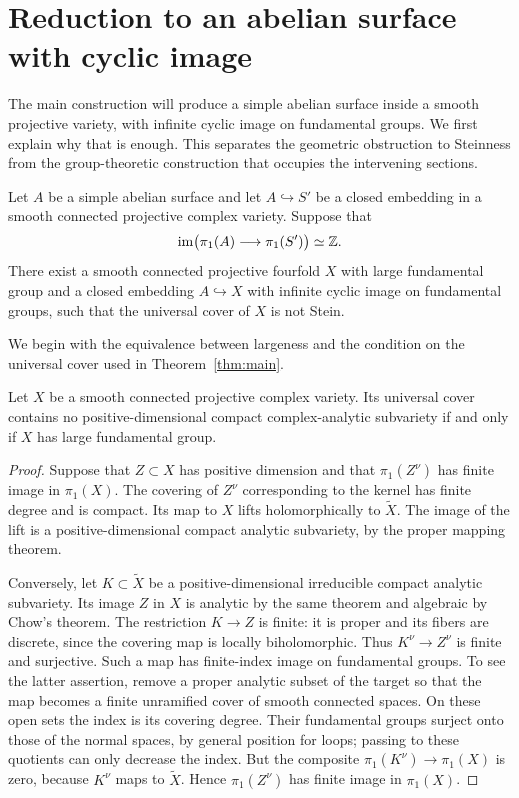 \section{Reduction to an abelian surface with cyclic image}
\label{sec:reduction}

The main construction will produce a simple abelian surface inside a
smooth projective variety, with infinite cyclic image on fundamental
groups.  We first explain why that is enough.  This separates the
geometric obstruction to Steinness from the group-theoretic construction
that occupies the intervening sections.

\begin{proposition}\label{prop:large-reduction}
Let $A$ be a simple abelian surface and let $A\hookrightarrow S'$ be a
closed embedding in a smooth connected projective complex variety.
Suppose that
\[
 \operatorname{im}\bigl(\pi_1(A)\longrightarrow\pi_1(S')\bigr)\simeq\mathbb Z.
\]
There exist a smooth connected projective fourfold $X$ with large
fundamental group and a closed embedding $A\hookrightarrow X$ with
infinite cyclic image on fundamental groups, such that the universal
cover of $X$ is not Stein.
\end{proposition}

We begin with the equivalence between largeness and the condition on
the universal cover used in Theorem~\ref{thm:main}.

\begin{lemma}\label{red:compact-criterion}
Let $X$ be a smooth connected projective complex variety.  Its universal
cover contains no positive-dimensional compact complex-analytic
subvariety if and only if $X$ has large fundamental group.
\end{lemma}

\begin{proof}
Suppose that $Z\subset X$ has positive dimension and that
$\pi_1(Z^\nu)$ has finite image in $\pi_1(X)$.  The covering of $Z^\nu$
corresponding to the kernel has finite degree and is compact.  Its map
to $X$ lifts holomorphically to $\widetilde X$.  The image of the lift
is a positive-dimensional compact analytic subvariety, by the proper
mapping theorem.

Conversely, let $K\subset\widetilde X$ be a positive-dimensional
irreducible compact analytic subvariety.  Its image $Z$ in $X$ is
analytic by the same theorem and algebraic by Chow's theorem.  The
restriction $K\to Z$ is finite: it is proper and its fibers are discrete,
since the covering map is locally biholomorphic.  Thus
$K^\nu\to Z^\nu$ is finite and surjective.  Such a map has finite-index
image on fundamental groups.  To see the latter assertion, remove a
proper analytic subset of the target so that the map becomes a finite
unramified cover of smooth connected spaces.  On these open sets the
index is its covering degree.  Their fundamental groups surject onto
those of the normal spaces, by general position for loops; passing to
these quotients can only decrease the index.  But the composite
$\pi_1(K^\nu)\to\pi_1(X)$ is zero, because $K^\nu$ maps to
$\widetilde X$.  Hence $\pi_1(Z^\nu)$ has finite image in $\pi_1(X)$.
\end{proof}

